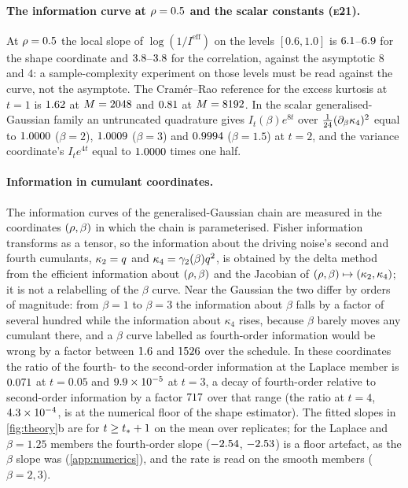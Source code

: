 \paragraph{The information curve at $\rho=0.5$ and the scalar constants (\textsc{e21}).}
At $\rho=0.5$ the local slope of $\log(1/I^{\mathrm{eff}})$ on the levels
$[0.6,1.0]$ is $6.1$--$6.9$ for the shape coordinate
and $3.8$--$3.8$ for the correlation, against the
asymptotic $8$ and $4$: a sample-complexity experiment on those levels must be read
against the curve, not the asymptote. The Cram\'er--Rao reference for the excess
kurtosis at $t=1$ is $1.62$ at $M=2048$ and
$0.81$ at $M=8192$. In the scalar generalised-Gaussian
family an untruncated quadrature gives $I_t(\beta)e^{8t}$ over
$\tfrac1{24}(\partial_\beta\kappa_4)^2$ equal to $1.0000$ ($\beta=2$),
$1.0009$ ($\beta=3$) and $0.9994$
($\beta=1.5$) at $t=2$, and the variance coordinate's $I_t e^{4t}$ equal to
$1.0000$ times one half.

\paragraph{Information in cumulant coordinates.}
The information curves of the generalised-Gaussian chain are measured in the coordinates $(\rho,\beta)$ in which the
chain is parameterised. Fisher information transforms as a tensor, so the information about the driving noise's
second and fourth cumulants, $\kappa_2=q$ and $\kappa_4=\gamma_2(\beta)q^2$, is obtained by the delta method from the
efficient information about $(\rho,\beta)$ and the Jacobian of $(\rho,\beta)\mapsto(\kappa_2,\kappa_4)$; it is not a relabelling
of the $\beta$ curve. Near the Gaussian the two differ by orders of magnitude: from $\beta=1$ to $\beta=3$ the information
about $\beta$ falls by a factor of several hundred while the information about $\kappa_4$ rises, because $\beta$ barely moves any cumulant
there, and a $\beta$ curve labelled as fourth-order information would be wrong by a factor between $1.6$ and
$1526$ over the schedule. In these coordinates the ratio of the fourth- to the second-order information at the Laplace member is
$0.071$ at $t=0.05$ and $9.9\times10^{-5}$ at $t=3$, a decay of fourth-order relative to second-order information by a factor
$717$ over that range (the ratio at $t=4$, $4.3\times10^{-4}$, is at the numerical floor of the shape estimator). The
fitted slopes in \cref{fig:theory}b are for $t\ge t_\ast+1$ on the mean over replicates; for the Laplace and $\beta=1.25$ members the
fourth-order slope ($-2.54$, $-2.53$) is a floor artefact, as the $\beta$ slope
was (\cref{app:numerics}), and the rate is read on the smooth members ($\beta=2,3$).

